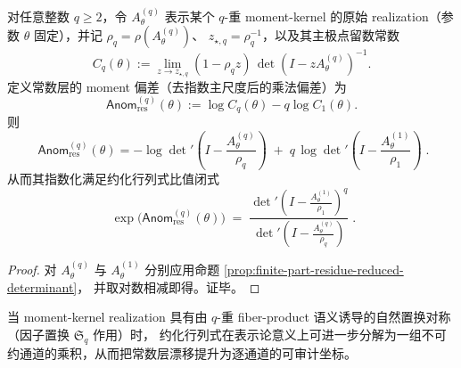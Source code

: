 \begin{corollary}\label{cor:finite-part-moment-anomaly-reduced-determinant-ratio}
对任意整数 \(q\ge 2\)，令 \(A^{(q)}_\theta\) 表示某个 \(q\)-重 moment-kernel 的原始 realization（参数 \(\theta\) 固定），并记
\(
\rho_q=\rho(A^{(q)}_\theta)
\)、
\(
z_{\star,q}=\rho_q^{-1}
\)，以及其主极点留数常数
\[
C_q(\theta):=\lim_{z\to z_{\star,q}}(1-\rho_q z)\,\det(I-zA^{(q)}_\theta)^{-1}.
\]
定义常数层的 moment 偏差（去指数主尺度后的乘法偏差）为
\[
\mathsf{Anom}^{(q)}_{\mathrm{res}}(\theta):=\log C_q(\theta)-q\log C_1(\theta).
\]
则
\[
\boxed{\;
\mathsf{Anom}^{(q)}_{\mathrm{res}}(\theta)
=
-\log\det\nolimits'\!\left(I-\frac{A^{(q)}_\theta}{\rho_q}\right)
\;+\;
q\,\log\det\nolimits'\!\left(I-\frac{A^{(1)}_\theta}{\rho_1}\right)\; }.
\]
从而其指数化满足约化行列式比值闭式
\[
\boxed{\;
\exp\bigl(\mathsf{Anom}^{(q)}_{\mathrm{res}}(\theta)\bigr)
\;=\;
\frac{\det\nolimits'\!\left(I-\frac{A^{(1)}_\theta}{\rho_1}\right)^{q}}
{\det\nolimits'\!\left(I-\frac{A^{(q)}_\theta}{\rho_q}\right)}\; }.
\]
\end{corollary}
\begin{proof}
对 \(A^{(q)}_\theta\) 与 \(A^{(1)}_\theta\) 分别应用命题 \ref{prop:finite-part-residue-reduced-determinant}，
并取对数相减即得。证毕。
\end{proof}

当 moment-kernel realization 具有由 \(q\)-重 fiber-product 语义诱导的自然置换对称（因子置换 \(\mathfrak{S}_q\) 作用）时，
约化行列式在表示论意义上可进一步分解为一组不可约通道的乘积，从而把常数层漂移提升为逐通道的可审计坐标。

